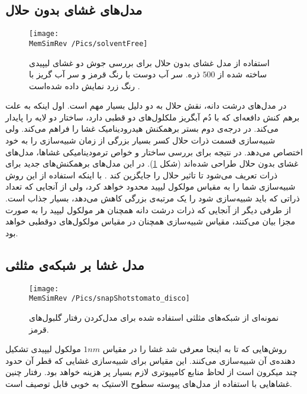 \subsection{
 مدل‌های غشای بدون حلال
 }
 \begin{figure}[h]
\begin{center}
\texttt{[image: \\MemSimRev /Pics/solventFree]}
\caption{
استفاده از مدل‌ غشای بدون حلال برای بررسی جوش دو غشای لیپیدی ساخته شده از
$500$
ذره. سر آب دوست با رنگ قرمز و سر آب گریز با رنگ زرد نمایش داده شده‌است 
\cite{Noguchi2001}.
}
\label{fig:solventFree}
\end{center}
\end{figure}

 در مدل‌های درشت دانه، نقش حلال به دو دلیل بسیار مهم است. اول اینکه به علت برهم کنش دافعه‌ای که با دُم آبگریز ملکلول‌های دو قطبی دارد، ساختار دو لایه را پایدار می‌کند. در درجه‌ی دوم بستر برهمکنش هیدرودینامیک غشا را فراهم می‌کند. ولی شبیه‌سازی قسمت ذرات حلال کسر بسیار بزرگی از زمان شبیه‌سازی را به خود اختصاص می‌دهد. در نتیجه برای بررسی ساختار و خواص ترمودینامیکی غشاها، مدل‌های غشای بدون حلال
 طراحی شده‌اند (شکل
 \ref{fig:solventFree}).
در این مدل‌های برهمکنش‌های جدید برای ذرات تعریف می‌شود تا تاثیر حلال را جایگزین کند
 \cite{Noguchi2001, Noguchi2001PRE, Brannigan2003, Cooke2005}.
 با اینکه استفاده از این روش شبیه‌سازی شما را به مقیاس مولکول لیپید محدود خواهد کرد، ولی از آنجایی که تعداد ذراتی که باید شبیه‌سازی شود را یک مرتبه‌ی بزرگی کاهش می‌دهد، بسیار جذاب است. از طرفی دیگر از آنجایی که  ذرات درشت دانه همچنان هر مولکول لیپید را به صورت مجزا بیان می‌کنند، مقیاس شبیه‌سازی همچنان در مقیاس مولکول‌های دوقطبی خواهد بود.

\subsection{
 مدل غشا بر شبکه‌ی مثلثی
 \label{sec:simRevMesh}
 }
  \begin{figure}[h]
\begin{center}
\texttt{[image: \\MemSimRev /Pics/snapShotstomato\_disco]}
\caption{
نمونه‌ای از شبکه‌های مثلثی استفاده شده برای مدل‌کردن رفتار گلبول‌های قرمز.
}
\label{fig:RBCmeshRep}
\end{center}
\end{figure}
 
روش‌هایی که تا به اینجا معرفی شد غشا را در مقیاس 
$1nm$
مولکول لیپیدی تشکیل دهنده‌ی آن شبیه‌سازی می‌کنند. این مقیاس برای شبیه‌سازی غشایی که قطر آن حدود چند میکرون است از لحاظ منابع کامپیوتری لازم بسیار پر هزینه خواهد بود. رفتار چنین غشا‌هایی با استفاده از مدل‌های پیوسته سطوح الاستیک به خوبی قابل توصیف است. 

